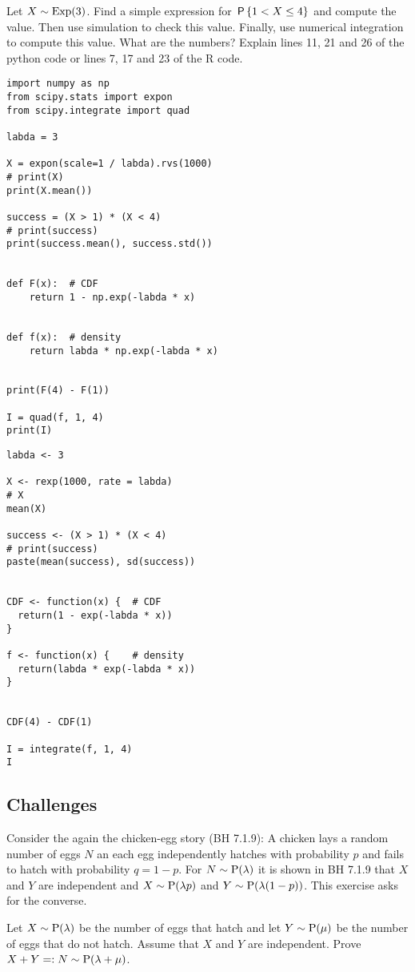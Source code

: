 \documentclass[assignments]{subfiles}
\begin{document}
\begin{exercise}
Let $X\sim\Exp{3}$.
Find a simple expression for $\P{1 < X \leq 4}$ and compute the value.
Then use simulation to check this value.
Finally, use numerical integration to compute this value. What are the numbers? Explain lines 11, 21 and 26 of the python code or lines 7, 17 and 23 of the R code.

\begin{verbatim}
import numpy as np
from scipy.stats import expon
from scipy.integrate import quad

labda = 3

X = expon(scale=1 / labda).rvs(1000)
# print(X)
print(X.mean())

success = (X > 1) * (X < 4)
# print(success)
print(success.mean(), success.std())


def F(x):  # CDF
    return 1 - np.exp(-labda * x)


def f(x):  # density
    return labda * np.exp(-labda * x)


print(F(4) - F(1))

I = quad(f, 1, 4)
print(I)
\end{verbatim}



\begin{verbatim}
labda <- 3

X <- rexp(1000, rate = labda)
# X
mean(X)

success <- (X > 1) * (X < 4)
# print(success)
paste(mean(success), sd(success))


CDF <- function(x) {  # CDF
  return(1 - exp(-labda * x))
}

f <- function(x) {    # density
  return(labda * exp(-labda * x))
}


CDF(4) - CDF(1)

I = integrate(f, 1, 4)
I
\end{verbatim}


\end{exercise}


\subsection{Challenges}
\label{sec:above-exam-level}

\begin{exercise} %
Consider the again the chicken-egg story (BH 7.1.9): A chicken lays a random number of eggs $N$ an each egg independently hatches with probability $p$ and fails to hatch with probability $q = 1-p$.
For $N \sim \Pois{\lambda}$ it is shown in BH 7.1.9 that $X$ and $Y$ are independent and $X\sim\Pois{\lambda p}$ and $Y\sim\Pois{\lambda(1-p)}$. 
This exercise asks for the converse.

Let $X\sim\Pois{\lambda}$ be the number of eggs that hatch and let $Y\sim\Pois{\mu}$ be the number of eggs that do not hatch.
Assume that $X$ and $Y$ are independent.
Prove  $X+Y =: N \sim \Pois{\lambda + \mu}$.
\end{exercise}
\end{document}
